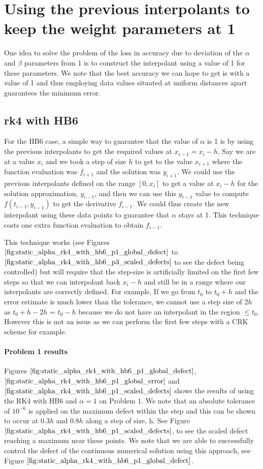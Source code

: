 
\section{Using the previous interpolants to keep the weight parameters at 1}
\label{section:keeping_alpha_at_1}
One idea to solve the problem of the loss in accuracy due to deviation of the $\alpha$ and $\beta$ parameters from 1 is to construct the interpolant using a value of 1 for these parameters. We note that the best accuracy we can hope to get is with a value of 1 and thus employing data values situated at uniform distances apart guarantees the minimum error.

\subsection{rk4 with HB6} For the HB6 case, a simple way to guarantee that the value of $\alpha$ is 1 is by using the previous interpolants to get the required values at $x_{i - 1}=x_i - h$. Say we are at a value $x_i$ and we took a step of size $h$ to get to the value $x_{i + 1}$ where the function evaluation was $f_{i + 1}$ and the solution was $y_{i + 1}$. We could use the previous interpolants defined on the range $[0, x_i]$ to get a value at $x_i - h$ for the solution approximation, $y_{i - 1}$, and then we can use this $y_{i-1}$ value to compute $f(t_{i-1}, y_{i-1})$ to get the derivative $f_{i - 1}$.  We could thus create the new interpolant using these data points to guarantee that $\alpha$ stays at 1. This technique costs one extra function evaluation to obtain $f_{i-1}$.

This technique works (see Figures $\ref{fig:static_alpha_rk4_with_hb6_p1_global_defect}$ to $\ref{fig:static_alpha_rk4_with_hb6_p3_scaled_defects}$ to see the defect being controlled) but will require that the step-size is artificially limited on the first few steps so that we can interpolant back $x_i - h$ and still be in a range where our interpolants are correctly defined. For example, If we go from $t_0$ to $t_0 + h$ and the error estimate is much lower than the tolerance, we cannot use a step size of $2h$ as $t_0 + h - 2h$ = $t_0-h$ because we do not have an interpolant in the region $\leq t_0$. However this is not an issue as we can perform the first few steps with a CRK scheme for example.

\paragraph{Problem 1 results}
Figures $\ref{fig:static_alpha_rk4_with_hb6_p1_global_defect}$, $\ref{fig:static_alpha_rk4_with_hb6_p1_global_error}$ and $\ref{fig:static_alpha_rk4_with_hb6_p1_scaled_defects}$ shows the results of using the RK4 with HB6 and $\alpha = 1$ on Problem 1. We note that an absolute tolerance of $10^{-6}$ is applied on the maximum defect within the step and this can be shown to occur at $0.3h$ and $0.8h$ along a step of size, h. See Figure $\ref{fig:static_alpha_rk4_with_hb6_p1_scaled_defects}$, to see the scaled defect reaching a maximum near these points. We note that we are able to successfully control the defect of the continuous numerical solution using this approach, see Figure $\ref{fig:static_alpha_rk4_with_hb6_p1_global_defect}$. 



